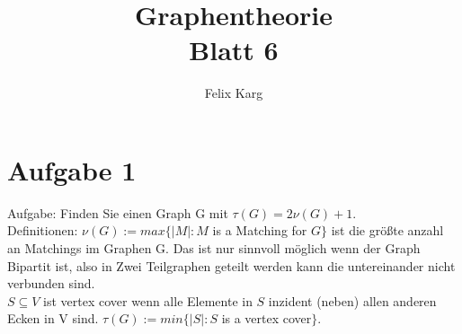 \documentclass{scrartcl}
\title{Graphentheorie \\ Blatt 6}
\author{Felix Karg}
\begin{document}
\maketitle


\section*{Aufgabe 1}
Aufgabe: Finden Sie einen Graph G mit $\tau(G) = 2\nu(G) + 1$. \\
Definitionen: $\nu(G) := max\{|M| : M$ is a Matching for $G\} $ ist die größte anzahl an Matchings im Graphen G. Das ist nur sinnvoll möglich wenn der Graph Bipartit ist, also in Zwei Teilgraphen geteilt werden kann die untereinander nicht verbunden sind. \\
$S \subseteq V$ ist vertex cover wenn alle Elemente in $S$ inzident (neben) allen anderen Ecken in V sind.
$\tau(G) := min\{|S| : S$ is a vertex cover$\}$.
\end{document}
